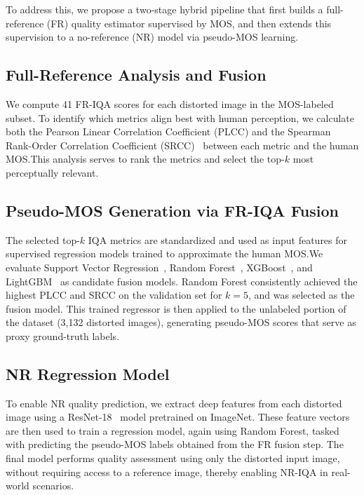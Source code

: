 To address this, we propose a two-stage hybrid pipeline that first builds a full-reference (FR) quality estimator supervised by MOS, and then extends this supervision to a no-reference (NR) model via pseudo-MOS learning.

\subsection{Full-Reference Analysis and Fusion}

We compute 41 FR-IQA scores for each distorted image in the MOS-labeled subset. To identify which metrics align best with human perception, we calculate both the Pearson Linear Correlation Coefficient (PLCC) and the Spearman Rank-Order Correlation Coefficient (SRCC)~\cite{plcc_srcc} between each metric and the human MOS.\@ This analysis serves to rank the metrics and select the top-$k$ most perceptually relevant.

\subsection{Pseudo-MOS Generation via FR-IQA Fusion}

The selected top-$k$ IQA metrics are standardized and used as input features for supervised regression models trained to approximate the human MOS.\@ We evaluate Support Vector Regression~\cite{svr}, Random Forest~\cite{randomforest}, XGBoost~\cite{xgboost}, and LightGBM~\cite{lightgbm} as candidate fusion models. Random Forest consistently achieved the highest PLCC and SRCC on the validation set for $k=5$, and was selected as the fusion model. This trained regressor is then applied to the unlabeled portion of the dataset (3,132 distorted images), generating pseudo-MOS scores that serve as proxy ground-truth labels.

\subsection{NR Regression Model}

To enable NR quality prediction, we extract deep features from each distorted image using a ResNet-18~\cite{resnet} model pretrained on ImageNet. These feature vectors are then used to train a regression model, again using Random Forest, tasked with predicting the pseudo-MOS labels obtained from the FR fusion step. The final model performs quality assessment using only the distorted input image, without requiring access to a reference image, thereby enabling NR-IQA in real-world scenarios.

